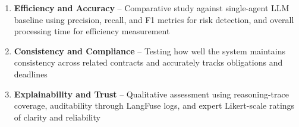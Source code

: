 \begin{enumerate}
    \item \textbf{Efficiency and Accuracy} – Comparative study against single-agent LLM baseline using precision, recall, and F1 metrics for risk detection, and overall processing time for efficiency measurement
    \item \textbf{Consistency and Compliance} – Testing how well the system maintains consistency across related contracts and accurately tracks obligations and deadlines
    \item \textbf{Explainability and Trust} – Qualitative assessment using reasoning-trace coverage, auditability through LangFuse logs, and expert Likert-scale ratings of clarity and reliability
\end{enumerate}
